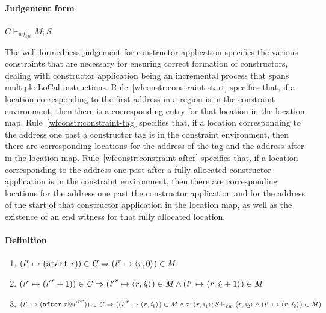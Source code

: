 \documentclass[showabstract,showacknowledgments,showpreface,showdedication,school]{iuphd}
\makeatletter
\theoremstyle{nonumberplain}
\newcommand{\sysname}[0]{LoCal\xspace}
\newcommand{\ourcalc}[0]{\sysname}
\newcommand{\keywd}[1]{\mathit{#1}}
\newcommand{\gramwd}[1]{\texttt{#1}}
\newcommand{\skeywd}[1]{\mathit{#1}}
\newcommand{\TYP}{\keywd{\tau}}
\newcommand{\loc}{\skeywd{l}}
\newcommand{\concreteloc}[3]{\ensuremath{\langle #1, #2 \rangle ^{#3}}}
\newcommand{\reg}{\skeywd{r}}
\newcommand{\ind}{\keywd{i}}
\newcommand{\STOR}{\keywd{S}}
\newcommand{\startr}[1]{(\gramwd{start}\; #1)}
\newcommand{\afterl}[1]{(\gramwd{after}\; #1)}
\newcommand{\CENV}{\keywd{C}}
\newcommand{\MENV}{\keywd{M}}
\newcommand{\locreg}[2]{\ensuremath{{#1}^{#2}}}
\newcommand{\tyatlocreg}[3]{#1 \ensuremath{@} \locreg{#2}{#3}}
\newcommand{\ewitness}[4]{\ensuremath{#1;#2;#3 \vdash_{ew} #4}}
\newcommand{\storewfcfa}[3]{\ensuremath{#1 \vdash_{wf_{cfc}} #2;#3}}
\makeatother
\begin{document}
\paragraph{Judgement form}

$\storewfcfa{\CENV}{\MENV}{\STOR}$

The well-formedness judgement for constructor application specifies the various constraints
that are necessary for ensuring correct formation of constructors, dealing with constructor
application being an incremental process that spans multiple \ourcalc{} instructions.
Rule~\ref{wfconstr:constraint-start} specifies that, if a location corresponding to the
first address in a region is in the constraint environment, then there is a corresponding
entry for that location in the location map.
Rule~\ref{wfconstr:constraint-tag} specifies that, if a location corresponding to the address one past a constructor
tag is in the constraint environment, then there are corresponding locations for the address
of the tag and the address after in the location map.
Rule~\ref{wfconstr:constraint-after} specifies that, if a location corresponding to the address
one past after a fully allocated constructor application is in the constraint environment,
then there are corresponding locations for the address one past the constructor application
and for the address of the start of that constructor application in the location map, as well as the existence
of an end witness for that fully allocated location.

\paragraph{Definition}

\begin{enumerate}
    \item \label{wfconstr:constraint-start} $ (\locreg{\loc}{\reg} \mapsto \startr{\reg}) \in \CENV \Rightarrow \\
            (\locreg{\loc}{\reg} \mapsto \concreteloc{\reg}{0}{}) \in \MENV $

    \item \label{wfconstr:constraint-tag} $ (\locreg{\loc}{\reg} \mapsto (\locreg{\loc'}{\reg} + 1)) \in \CENV \Rightarrow
            \\
            (\locreg{\loc'}{\reg} \mapsto \concreteloc{\reg}{\ind_l}{})  \in \MENV \wedge \\
            (\locreg{\loc}{\reg} \mapsto \concreteloc{\reg}{\ind_l + 1}{})  \in \MENV
            $

    \item \label{wfconstr:constraint-after} $ (\locreg{\loc}{\reg} \mapsto \afterl{\tyatlocreg{\TYP}{\locreg{\loc'}{\reg}}{\reg}}) \in \CENV \Rightarrow \\
            ((\locreg{\loc'}{\reg} \mapsto \concreteloc{\reg}{\ind_1}{}) \in \MENV \wedge \\
            \ewitness{\TYP}{\concreteloc{\reg}{\ind_1}{}}{\STOR}{\concreteloc{\reg}{\ind_2}{}} \wedge \\
            (\locreg{\loc}{\reg} \mapsto \concreteloc{\reg}{\ind_2}{}) \in \MENV)
            $

\end{enumerate}
\end{document}
